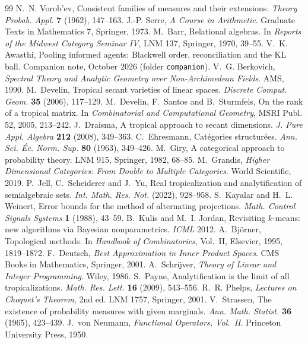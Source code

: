 \documentclass[11pt]{article}
\theoremstyle{definition}
\begin{document}
\begin{thebibliography}{99}
 N.~N. Vorob'ev, Consistent families of measures and their extensions. \emph{Theory Probab. Appl.} \textbf{7}
  (1962), 147--163.
 J.-P. Serre, \emph{A Course in Arithmetic}. Graduate Texts in Mathematics 7, Springer, 1973.
 M.~Barr, Relational algebras. In \emph{Reports of the Midwest Category Seminar IV}, LNM 137, Springer, 1970, 39--55.
 V.~K. Awasthi, Pooling informed agents: Blackwell order, reconciliation and the KL ball. Companion note,
  October 2026 (folder \texttt{companion}).
 V.~G. Berkovich, \emph{Spectral Theory and Analytic Geometry over Non-Archimedean Fields}. AMS, 1990.
 M.~Develin, Tropical secant varieties of linear spaces. \emph{Discrete Comput. Geom.} \textbf{35} (2006), 117--129.
 M.~Develin, F.~Santos and B.~Sturmfels, On the rank of a tropical matrix. In \emph{Combinatorial and
Computational Geometry}, MSRI Publ. 52, 2005, 213--242.
 J.~Draisma, A tropical approach to secant dimensions. \emph{J. Pure Appl. Algebra} \textbf{212} (2008), 349--363.
 C.~Ehresmann, Cat\'egories structur\'ees. \emph{Ann. Sci. \'Ec. Norm. Sup.} \textbf{80} (1963), 349--426.
 M.~Giry, A categorical approach to probability theory. LNM 915, Springer, 1982, 68--85.
 M.~Grandis, \emph{Higher Dimensional Categories: From Double to Multiple Categories}. World Scientific, 2019.
 P.~Jell, C.~Scheiderer and J.~Yu, Real tropicalization and analytification of semialgebraic sets.
\emph{Int. Math. Res. Not.} (2022), 928--958.
 S.~Kayalar and H.~L. Weinert, Error bounds for the method of alternating projections. \emph{Math. Control
Signals Systems} \textbf{1} (1988), 43--59.
 B.~Kulis and M.~I. Jordan, Revisiting $k$-means: new algorithms via Bayesian nonparametrics. \emph{ICML} 2012.
 A.~Bj\"orner, Topological methods. In \emph{Handbook of Combinatorics}, Vol.~II, Elsevier, 1995, 1819--1872.
 F.~Deutsch, \emph{Best Approximation in Inner Product Spaces}. CMS Books in Mathematics, Springer, 2001.
 A.~Schrijver, \emph{Theory of Linear and Integer Programming}. Wiley, 1986.
 S.~Payne, Analytification is the limit of all tropicalizations. \emph{Math. Res. Lett.} \textbf{16} (2009), 543--556.
 R.~R. Phelps, \emph{Lectures on Choquet's Theorem}, 2nd ed. LNM 1757, Springer, 2001.
 V.~Strassen, The existence of probability measures with given marginals. \emph{Ann. Math. Statist.} \textbf{36}
(1965), 423--439.
 J.~von Neumann, \emph{Functional Operators, Vol.~II}. Princeton University Press, 1950.
\end{thebibliography}
\end{document}
